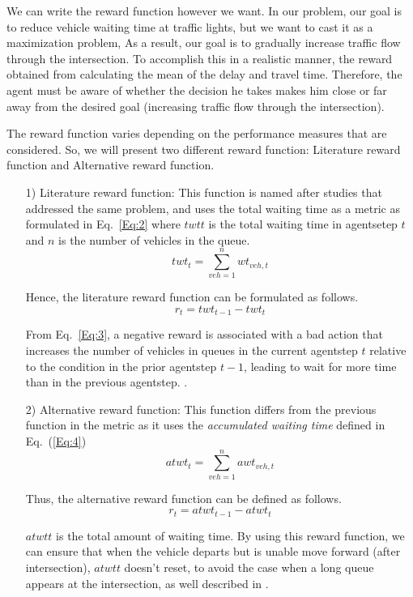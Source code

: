 \documentclass[conference]{IEEEtran}
\begin{document}
We can write the reward function however we want. In our problem, our goal is to reduce vehicle waiting time at traffic lights, but we want to cast it as a maximization problem, As a result, our goal is to gradually increase traffic flow through the intersection. To accomplish this in a realistic manner, the reward obtained from calculating the mean of the delay and travel time. Therefore, the agent must be aware of whether the decision he takes makes him close or far away from the desired goal (increasing traffic flow through the intersection). 

The reward function varies depending on the performance measures that are considered. So, we will present two different reward function: Literature reward function and Alternative reward function.

\begin{enumerate}
    \item [1)] Literature reward function:
    This function is named after studies that addressed the same problem, and uses the total waiting time as a metric as formulated in Eq.~\ref{Eq:2} where $twt t$ is the total waiting time in agentsetep $t$ and $n$ is the number of vehicles in the queue.
    \begin{equation}
    \label{Eq:2}
    twt_t= \sum_{veh=1}^{n} {wt_{veh,t}}
    \end{equation}
    
    Hence, the literature reward function can be formulated as follows.
    \begin{equation}
    \label{Eq:3}
    r_t= twt_{t-1} - twt_t
    \end{equation}
    
    From Eq.~\ref{Eq:3}, a negative reward is associated with a bad action that increases the number of vehicles in queues in the current agentstep $t$ relative to the condition in the prior agentstep $t-1$, leading to wait for more time than in the previous agentstep. \cite{Deep}.\\
    
    \item [2)] Alternative reward function:
    This function differs from the previous function in the metric as it uses the \textit{accumulated waiting time} defined in Eq.~(\ref{Eq:4})
    \begin{equation}
    \label{Eq:4}
    atwt_t= \sum_{veh=1}^{n} {awt_{veh,t}}
    \end{equation}
    
    Thus, the alternative reward function can be defined as follows.
    \begin{equation}
    \label{Eq:5}
    r_t= atwt_{t-1} - atwt_t
    \end{equation}
    
    $atwt t$ is the total amount of waiting time. By using this reward function, we can ensure that when the vehicle departs but is unable move forward (after intersection), $atwt t$ doesn't reset, to avoid the case  when a long queue appears at the intersection, as well described in \cite{Deep}.

\end{enumerate}
\end{document}
